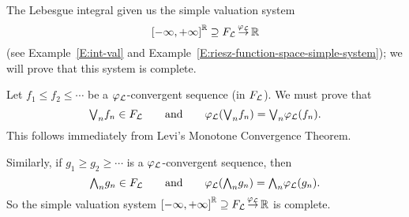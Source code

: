 \documentclass[main.tex]{subfiles}
\begin{document}
\begin{ex}
\label{E:complete-lint}
The Lebesgue integral
given us the  simple valuation system
\begin{equation*}
\vsLF
\end{equation*}
(see Example~\ref{E:int-val} and
Example~\ref{E:riesz-function-space-simple-system});
we will prove that this system is complete.

Let $f_1 \leq f_2 \leq \dotsb$
be a $\Lphi$-convergent sequence (in $\LF$).
We must prove that 
\begin{equation*}
\bv_n f_n \in\LF
\qquad\text{and}\qquad\Lphi(\bv_n f_n) = \bv_n \Lphi (f_n).
\end{equation*}
This follows immediately from Levi's Monotone Convergence Theorem.

Similarly,
if $g_1 \geq g_2 \geq \dotsb$
is a $\Lphi$-convergent sequence,
then
\begin{equation*}
\bw_n g_n \in\LF
\qquad\text{and}\qquad\Lphi(\bw_n g_n) = \bw_n \Lphi (g_n).
\end{equation*}
So the simple valuation system $\vsLF$ is complete.
\end{ex}


%
%
\end{document}
